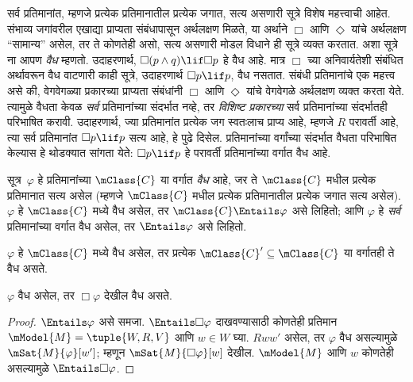 \begin{explain}
  सर्व प्रतिमानांत, म्हणजे प्रत्येक प्रतिमानातील प्रत्येक जगात, सत्य
  असणारी सूत्रे विशेष महत्त्वाची आहेत. संभाव्य जगांवरील
  एखाद्या प्राप्यता संबंधापासून अर्थलक्षण मिळते, या अर्थाने
  $\Box$ आणि $\Diamond$ यांचे अर्थलक्षण ``सामान्य'' असेल,
  तर ते कोणतेही असो, सत्य असणारी मोडल विधाने ही सूत्रे व्यक्त
  करतात. अशा सूत्रे ना आपण \emph{वैध} म्हणतो. उदाहरणार्थ,
  $\Box(p \land q) \lif \Box p$ हे वैध आहे. मात्र $\Box$
  च्या अनिवार्यतेशी संबंधित अर्थावरून वैध वाटणारी काही
  सूत्रे, उदाहरणार्थ $\Box p \lif p$, वैध नसतात.
  संबंधी प्रतिमानांचे एक महत्त्व असे की, वेगवेगळ्या प्रकारच्या
  प्राप्यता संबंधांनी $\Box$ आणि $\Diamond$ यांचे वेगवेगळे
  अर्थलक्षण व्यक्त करता येते. त्यामुळे वैधता केवळ \emph{सर्व}
  प्रतिमानांच्या संदर्भात नव्हे, तर \emph{विशिष्ट प्रकारच्या}
  सर्व प्रतिमानांच्या संदर्भातही परिभाषित करावी. उदाहरणार्थ,
  ज्या प्रतिमानांत प्रत्येक जग स्वतःलाच प्राप्य आहे, म्हणजे
  $R$ परावर्ती आहे, त्या सर्व प्रतिमानांत $\Box p \lif p$
  सत्य आहे, हे पुढे दिसेल. प्रतिमानांच्या वर्गांच्या संदर्भात
  वैधता परिभाषित केल्यास हे थोडक्यात सांगता येते:
  $\Box p \lif p$ हे परावर्ती प्रतिमानांच्या वर्गात वैध आहे.
\end{explain}

\begin{defn}
  सूत्र~$\varphi$ हे प्रतिमानांच्या $\mClass{C}$ या वर्गात
  \emph{वैध} आहे, जर ते $\mClass{C}$ मधील प्रत्येक प्रतिमानात
  सत्य असेल (म्हणजे $\mClass{C}$ मधील प्रत्येक प्रतिमानातील
  प्रत्येक जगात सत्य असेल). $\varphi$ हे $\mClass{C}$ मध्ये वैध
  असेल, तर $\mClass{C} \Entails \varphi$ असे लिहितो; आणि $\varphi$
  हे \emph{सर्व} प्रतिमानांच्या वर्गात वैध असेल, तर
  $\Entails \varphi$ असे लिहितो.
\end{defn}

\begin{prop}\label{nml:syn:val:prop:subset-class}
  $\varphi$ हे $\mClass{C}$ मध्ये वैध असेल, तर प्रत्येक
  $\mClass{C}' \subseteq \mClass{C}$ या वर्गातही ते वैध असते.
\end{prop}

\begin{prop}\label{nml:syn:val:prop:Nec-rule}
  $\varphi$ वैध असेल, तर $\Box\varphi$ देखील वैध असते.
\end{prop}

\begin{proof}
  $\Entails \varphi$ असे समजा. $\Entails \Box\varphi$ दाखवण्यासाठी
  कोणतेही प्रतिमान $\mModel{M} = \tuple{W, R, V}$ आणि
  $w \in W$ घ्या. $Rww'$ असेल, तर $\varphi$ वैध असल्यामुळे
  $\mSat{M}{\varphi}[w']$; म्हणून $\mSat{M}{\Box\varphi}[w]$ देखील.
  $\mModel{M}$ आणि $w$ कोणतेही असल्यामुळे
  $\Entails \Box\varphi$.
\end{proof}

